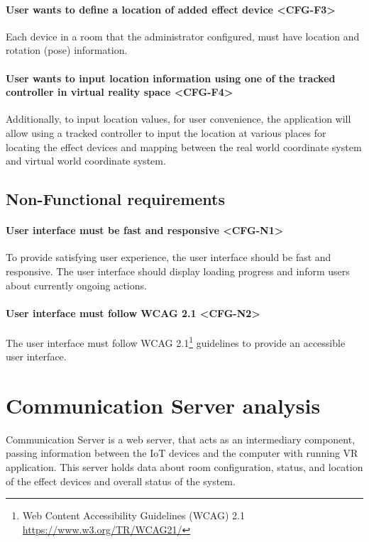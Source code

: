 \paragraph*{User wants to define a location of added effect device <CFG-F3>}
Each device in a room that the administrator configured,
must have location and rotation (pose) information.


\paragraph*{User wants to input location information using one of the tracked controller in virtual reality space <CFG-F4>}
Additionally, to input location values, for user convenience,
the application will allow using a tracked controller to input the location at
various places for locating the effect
devices and mapping between the real world coordinate system and virtual
world coordinate system.


\subsection{Non-Functional requirements}

\paragraph*{User interface must be fast and responsive <CFG-N1>}
To provide satisfying user experience, the user interface should be fast and
responsive. The user interface should display loading progress and inform users
about currently ongoing actions.


\paragraph*{User interface must follow WCAG 2.1 <CFG-N2>}
The user interface must follow WCAG 2.1\footnote{Web Content Accessibility 
Guidelines (WCAG) 2.1 \href{https://www.w3.org/TR/WCAG21/}{https://www.w3.org/TR/WCAG21/}}
guidelines to provide an accessible user interface.


\section{Communication Server analysis}\label{analysis:server}

Communication Server is a web server, that acts as an intermediary component,
passing information between the IoT devices and the computer with
running VR application. This server holds data about room configuration,
status, and location of the effect devices and overall status of the system.

